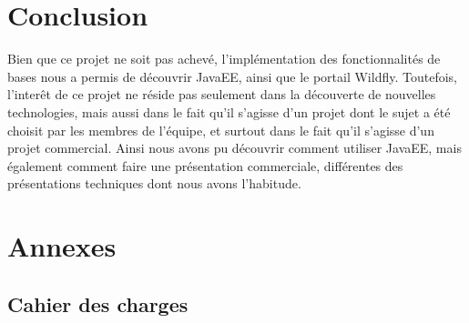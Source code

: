 \documentclass[a4paper,11pt]{report}
\begin{document}
\chapter{Conclusion}
  Bien que ce projet ne soit pas achevé, l'implémentation des fonctionnalités de bases nous a permis de découvrir JavaEE, ainsi que le portail Wildfly.
  Toutefois, l'interêt de ce projet ne réside pas seulement dans la découverte de nouvelles technologies, mais aussi dans le fait qu'il s'agisse d'un projet dont le sujet a été choisit par les membres de l'équipe, et surtout dans le fait qu'il s'agisse d'un projet commercial.
  Ainsi nous avons pu découvrir comment utiliser JavaEE, mais également comment faire une présentation commerciale, différentes des présentations techniques dont nous avons l'habitude.

\chapter{Annexes}

  \section{Cahier des charges}
    
\end{document}
